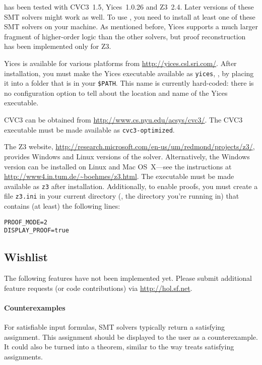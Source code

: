  has been tested with CVC3~1.5, Yices~1.0.26 and Z3~2.4.
Later versions of these SMT solvers might work as well.  To use
, you need to install at least one of these SMT solvers
on your machine.  As mentioned before, Yices supports a much larger
fragment of higher-order logic than the other solvers, but proof
reconstruction has been implemented only for Z3.

Yices is available for various platforms from
\url{http://yices.csl.sri.com/}.  After installation, you must make
the Yices executable available as {\tt yices}, \eg, by placing it into
a folder that is in your {\tt \$PATH}.  This name is currently
hard-coded: there is no configuration option to tell \HOL{} about the
location and name of the Yices executable.

CVC3 can be obtained from \url{http://www.cs.nyu.edu/acsys/cvc3/}.
The CVC3 executable must be made available as {\tt cvc3-optimized}.

The Z3 website,
\url{http://research.microsoft.com/en-us/um/redmond/projects/z3/},
provides Windows and Linux versions of the solver.  Alternatively, the
Windows version can be installed on Linux and Mac OS~X---see the
instructions at \url{http://www4.in.tum.de/~boehmes/z3.html}.  The
executable must be made available as {\tt z3} after installation.
Additionally, to enable proofs, you must create a file {\tt z3.ini} in
your current directory (\ie, the directory you're running \HOL{} in)
that contains (at least) the following lines:
\begin{verbatim}
PROOF_MODE=2
DISPLAY_PROOF=true
\end{verbatim}

\subsection{Wishlist}

The following features have not been implemented yet.  Please submit
additional feature requests (or code contributions) via
\url{http://hol.sf.net}.

\paragraph{Counterexamples}

For satisfiable input formulas, SMT solvers typically return a
satisfying assignment.  This assignment should be displayed to the
\HOL{} user as a counterexample.  It could also be turned into a
theorem, similar to the way  treats satisfying
assignments.

